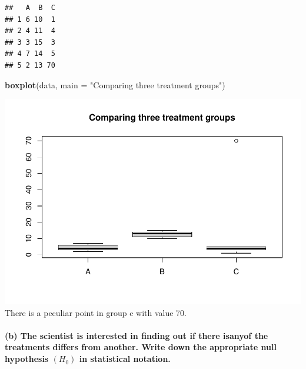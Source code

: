 \documentclass[
]{article}
\newenvironment{Shaded}{\begin{snugshade}}{\end{snugshade}}
\newcommand{\DataTypeTok}[1]{\textcolor[rgb]{0.13,0.29,0.53}{#1}}
\newcommand{\KeywordTok}[1]{\textcolor[rgb]{0.13,0.29,0.53}{\textbf{#1}}}
\newcommand{\NormalTok}[1]{#1}
\newcommand{\StringTok}[1]{\textcolor[rgb]{0.31,0.60,0.02}{#1}}
\begin{document}
\begin{verbatim}
##   A  B  C
## 1 6 10  1
## 2 4 11  4
## 3 3 15  3
## 4 7 14  5
## 5 2 13 70
\end{verbatim}

\begin{Shaded}
\begin{Highlighting}[]
\KeywordTok{boxplot}\NormalTok{(data, }\DataTypeTok{main =} \StringTok{"Comparing three treatment groups"}\NormalTok{)}
\end{Highlighting}
\end{Shaded}

\includegraphics{Mid1_XiangyuRen_files/figure-latex/unnamed-chunk-1-1.pdf}
There is a peculiar point in group c with value 70.

\hypertarget{b-the-scientist-is-interested-in-finding-out-if-there-isanyof-the-treatments-differs-from-another.-write-down-the-appropriate-null-hypothesis-h_0-in-statistical-notation.}{%
\paragraph{\texorpdfstring{(b) The scientist is interested in finding
out if there isanyof the treatments differs from another. Write down the
appropriate null hypothesis \((H_0)\) in statistical
notation.}{(b) The scientist is interested in finding out if there isanyof the treatments differs from another. Write down the appropriate null hypothesis (H\_0) in statistical notation.}}\label{b-the-scientist-is-interested-in-finding-out-if-there-isanyof-the-treatments-differs-from-another.-write-down-the-appropriate-null-hypothesis-h_0-in-statistical-notation.}}
\end{document}
